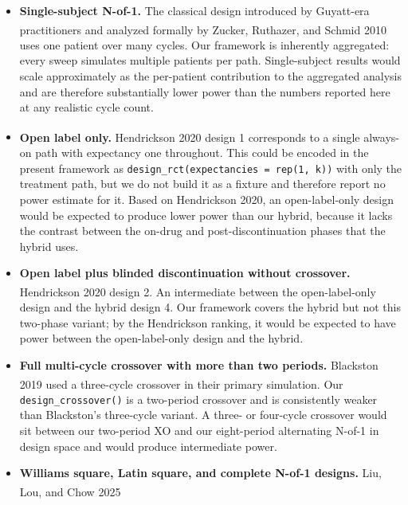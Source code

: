 \documentclass[
  11pt,
]{article}
\providecommand{\tightlist}{%
  \setlength{\itemsep}{0pt}\setlength{\parskip}{0pt}}
\begin{document}
\begin{itemize}
\tightlist
\item
  \textbf{Single-subject N-of-1.} The classical design introduced by
  Guyatt-era practitioners and analyzed formally by Zucker, Ruthazer,
  and Schmid
  2010\textsuperscript{}
  uses one patient over many cycles. Our framework is inherently
  aggregated: every sweep simulates multiple patients per path.
  Single-subject results would scale approximately as the per-patient
  contribution to the aggregated analysis and are therefore
  substantially lower power than the numbers reported here at any
  realistic cycle count.
\item
  \textbf{Open label only.} Hendrickson
  2020\textsuperscript{}
  design 1 corresponds to a single always-on path with expectancy one
  throughout. This could be encoded in the present framework as
  \texttt{design\_rct(expectancies\ =\ rep(1,\ k))} with only the
  treatment path, but we do not build it as a fixture and therefore
  report no power estimate for it. Based on Hendrickson 2020, an
  open-label-only design would be expected to produce lower power than
  our hybrid, because it lacks the contrast between the on-drug and
  post-discontinuation phases that the hybrid uses.
\item
  \textbf{Open label plus blinded discontinuation without crossover.}
  Hendrickson
  2020\textsuperscript{}
  design 2. An intermediate between the open-label-only design and the
  hybrid design 4. Our framework covers the hybrid but not this
  two-phase variant; by the Hendrickson ranking, it would be expected to
  have power between the open-label-only design and the hybrid.
\item
  \textbf{Full multi-cycle crossover with more than two periods.}
  Blackston
  2019\textsuperscript{}
  used a three-cycle crossover in their primary simulation. Our
  \texttt{design\_crossover()} is a two-period crossover and is
  consistently weaker than Blackston's three-cycle variant. A three- or
  four-cycle crossover would sit between our two-period XO and our
  eight-period alternating N-of-1 in design space and would produce
  intermediate power.
\item
  \textbf{Williams square, Latin square, and complete N-of-1 designs.}
  Liu, Lou, and Chow
  2025\textsuperscript{}

\end{itemize}
\end{document}
